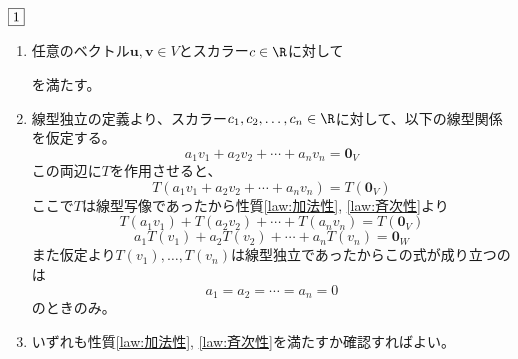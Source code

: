 \documentclass[dvipdfmx]{jsreport}
\begin{document}
\begin{souanswer} %
	$\fbox{1}$
\begin{enumerate}
	\item 任意のベクトル$\bm{u}, \bm{v}\in V$とスカラー$c\in \R$に対して
	を満たす。
	\item 線型独立の定義より、スカラー$c_1, c_2, \ldots, c_n\in \R$に対して、以下の線型関係を仮定する。
\begin{equation*}
	a_1v_1+ a_2v_2+ \cdots+ a_nv_n= \bm{0}_V
\end{equation*}
	この両辺に$T$を作用させると、
\begin{equation*}
	T(a_1v_1+ a_2v_2+ \cdots+ a_nv_n)= T(\bm{0}_V)
\end{equation*}
	ここで$T$は線型写像であったから性質\ref{law:加法性}, \ref{law:斉次性}より
\begin{equation*}
	T(a_1v_1)+ T(a_2v_2)+ \cdots+ T(a_nv_n)= T(\bm{0}_V)
\end{equation*}
\begin{equation*}
	a_1T(v_1)+ a_2T(v_2)+ \cdots+ a_nT(v_n)= \bm{0}_W
\end{equation*}
	また仮定より$T(v_1), \ldots, T(v_n)$は線型独立であったからこの式が成り立つのは
\begin{equation*}
	a_1= a_2= \cdots= a_n= 0
\end{equation*}
	のときのみ。
	\item いずれも性質\ref{law:加法性}, \ref{law:斉次性}を満たすか確認すればよい。
\end{enumerate}
\end{souanswer}
\end{document}
